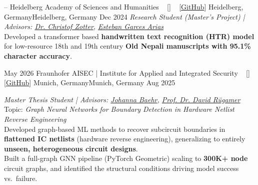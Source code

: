 
\begin{experiences}

  \researchexperience
  {--} {Heidelberg Academy of Sciences and Humanities {\normalfont  ~ [\href{https://en.hadw-bw.de/}{\small{\websiteSymbol}}] ~ [\href{https://github.com/anjalisarawgi/nepOCR}{GitHub}] }}{Heidelberg, Germany}{Heidelberg, Germany}
       {Dec 2024} {\textit{Research Student (Master's Project) | Advisors: \href{https://www.hadw-bw.de/en/mitarbeiter/dr-christof-zotter}{Dr. Christof Zotter},  \href{https://www.misoda.statistik.uni-muenchen.de/personen/mitarbeiter/garcesarias/index.html}{Esteban Garces Arias}}\\
     Developed a transformer based \textbf{handwritten text recognition (HTR) model} for low-resource 18th and 19th century \textbf{Old Nepali manuscripts with 95.1\% character accuracy}.
     \vskip 0.1cm
     }
   \emptySeparator

\researchexperience
    {May 2026}   {Fraunhofer AISEC | Institute for Applied and Integrated Security {\normalfont  ~ [\href{https://www.aisec.fraunhofer.de/en/fields-of-expertise/HWS.html}{\small{\websiteSymbol}}]  ~ [\href{https://github.com/anjalisarawgi/gnns-netlist-re}{GitHub}]
    }}{Munich, Germany}{Munich, Germany}
    {Aug 2025} {\textit{Master Thesis Student | Advisors:  \href{https://www.ce.cit.tum.de/eisec/mitarbeiter/johanna-baehr/}{Johanna Baehr}, \href{https://davidruegamer.github.io/}{Prof. Dr. David Rügamer}}\\
    Topic: \textit{Graph Neural Networks for Boundary Detection in Hardware Netlist Reverse Engineering}\\[2pt]
    Developed graph-based ML methods to recover subcircuit boundaries in \textbf{flattened IC netlists} (hardware reverse engineering), generalizing to entirely \textbf{unseen, heterogeneous circuit designs}.\\[3pt]
    Built a full-graph GNN pipeline (PyTorch Geometric) scaling to \textbf{300K+ node} circuit graphs, and identified the structural conditions driving model success vs.\ failure.


}
\end{experiences}
